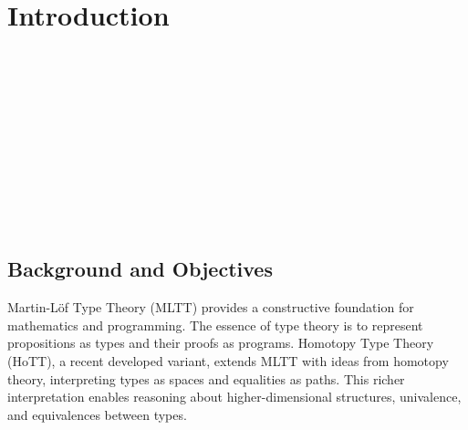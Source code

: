 \chapter{Introduction}

\begin{code}[hide]%
\>[0]\AgdaSymbol{\{-\#}\AgdaSpace{}%
\AgdaSpace{}%
\AgdaSpace{}%
\AgdaSpace{}%
\AgdaSymbol{\#-\}}\<%
\\
%
\\[\AgdaEmptyExtraSkip]%
\>[0]\AgdaSpace{}%
\AgdaSpace{}%
\<%
\\
\>[0]\AgdaSpace{}%
\AgdaSpace{}%
\<%
\\
\>[0]\AgdaSpace{}%
\AgdaSpace{}%
\<%
\\
\>[0]\AgdaSpace{}%
\AgdaSpace{}%
\<%
\\
\>[0]\AgdaSpace{}%
\AgdaSpace{}%
\<%
\\
\>[0]\AgdaSpace{}%
\AgdaSpace{}%
\AgdaSpace{}%
\AgdaSpace{}%
\AgdaSymbol{(}\AgdaSpace{}%
\AgdaSpace{}%
\AgdaSymbol{)}\<%
\\
\>[0]\AgdaSpace{}%
\AgdaSpace{}%
\<%
\\
%
\\[\AgdaEmptyExtraSkip]%
\>[0]\AgdaSpace{}%
\AgdaSpace{}%
\AgdaSymbol{:}\AgdaSpace{}%
\<%
\end{code}

\section{Background and Objectives}

Martin-Löf Type Theory (MLTT) provides a constructive foundation for mathematics and programming. The essence of type theory is to represent propositions as types and their proofs as programs. Homotopy Type Theory (HoTT), a recent developed variant, extends MLTT with ideas from homotopy theory, interpreting types as spaces and equalities as paths. This richer interpretation enables reasoning about higher-dimensional structures, univalence, and equivalences between types.

